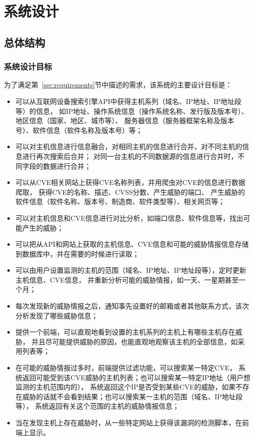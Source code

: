 \chapter{系统设计}
\label{cha:design}

\section{总体结构}
\label{chap3:structure}

\subsection{系统设计目标}
\label{sec:goal}

为了满足第~\ref{sec:requirements}节中描述的需求，该系统的主要设计目标是：

\begin{itemize}
    \item 可以从互联网设备搜索引擎API中获得主机系列（域名、IP地址、IP地址段等）的信息，
    如IP地址、操作系统信息（操作系统名称、发行版及版本号）、地区信息（国家、地区、城市等）、
    服务器信息（服务器框架名称及版本号）、软件信息（软件名称及版本号）等；
    \item 可以对主机信息进行信息融合，对相同主机的信息进行合并，对不同主机的信息进行再次搜索后合并；
    对同一台主机的不同数据源的信息进行合并时，不同字段的数据进行合并；
    \item 可以从CVE相关网站上获得CVE名称列表，并用爬虫对CVE的信息进行数据爬取，
    获得CVE的名称、描述、CVSS\cite{mell2007complete}分数、产生威胁的端口、
    产生威胁的软件信息（软件名称、版本号、制造商、软件类型等）、相关网页等；
    \item 可以对主机信息和CVE信息进行对比分析，如端口信息、软件信息等，找出可能产生的威胁；
    \item 可以把从API和网站上获取的主机信息、CVE信息和可能的威胁情报信息存储到数据库中，并在需要的时候进行读取；
    \item 可以由用户设置监测的主机的范围（域名、IP地址、IP地址段等），定时更新主机信息、CVE信息，
    并重新分析可能的威胁情报，如一天、一星期甚至一个月；
    \item 每次发现新的威胁情报之后，通知事先设置好的邮箱或者其他联系方式，该次分析发现了哪些威胁信息；
    \item 提供一个前端，可以直观地看到设置的主机系列的主机上有哪些主机存在威胁，
    并且尽可能提供威胁的原因，也能直观地观察该主机的全部信息，如采用列表等；
    \item 在可能的威胁情报过多时，前端提供过滤功能，可以搜索某一特定CVE，
    系统返回可能受到该CVE威胁的主机列表；也可以搜索某一特定IP地址（用户想监测的主机范围内的），
    系统返回这个IP是否受到某些CVE的威胁，如果不存在威胁的话就不会看到结果；也可以搜索某一主机的范围（域名、IP地址段等），
    系统返回有关这个范围的主机的威胁情报信息；
    \item 当在发现主机上存在威胁时，从一些特定网站上获得该漏洞的检测脚本，在前端上显示。
\end{itemize}

